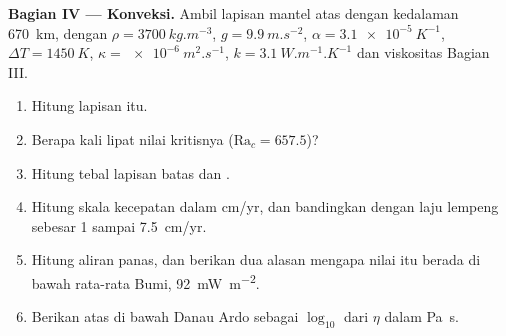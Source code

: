 \begin{problem}
\medskip\noindent\textbf{Bagian IV --- Konveksi.} Ambil lapisan mantel atas dengan kedalaman
\qty{670}{km}, dengan $\rho = \qty{3700}{kg.m^{-3}}$, $g =
\qty{9.9}{m.s^{-2}}$, $\alpha = \qty{3.1e-5}{K^{-1}}$, $\Delta T =
\qty{1450}{K}$, $\kappa = \qty{e-6}{m^2.s^{-1}}$, $k = \qty{3.1}{W.m^{-1}.K^{-1}}$
dan viskositas Bagian III.
\begin{enumerate}[resume]
  \item Hitung  lapisan itu.
  \item Berapa kali lipat nilai kritisnya ($\mathrm{Ra}_c = 657.5$)?
  \item Hitung tebal lapisan batas dan .
  \item Hitung skala kecepatan dalam \unit{cm/yr}, dan bandingkan dengan laju
        lempeng sebesar 1 sampai \qty{7.5}{cm/yr}.
  \item Hitung aliran panas, dan berikan dua alasan mengapa nilai itu berada di bawah
        rata-rata Bumi, \qty{92}{mW.m^{-2}}.
  \item Berikan  atas di bawah Danau Ardo sebagai $\log_{10}$ dari
        $\eta$ dalam \unit{Pa.s}.
\end{enumerate}
\end{problem}
